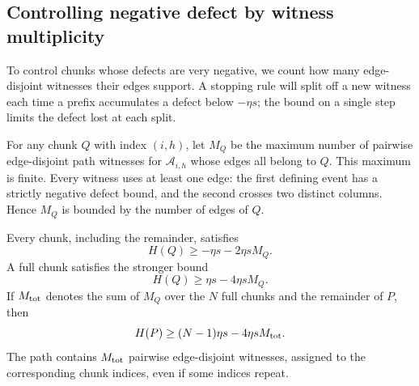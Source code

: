 \subsection{Controlling negative defect by witness multiplicity}

To control chunks whose defects are very negative, we count how many
edge-disjoint witnesses their edges support. A stopping rule will split
off a new witness each time a prefix accumulates a defect below $-\eta s$;
the bound on a single step limits the defect lost at each split.

For any chunk $Q$ with index $(i,h)$, let $M_Q$ be the maximum number of
pairwise edge-disjoint path witnesses for $\mathcal A_{i,h}$ whose edges
all belong to $Q$.  This maximum is finite.  Every witness uses at least
one edge: the first defining event has a strictly negative defect bound,
and the second crosses two distinct columns.  Hence $M_Q$ is bounded by
the number of edges of $Q$.

\begin{lemma}
\label{df:wi:chunk-defect}
Every chunk, including the remainder, satisfies
\begin{equation}
\label{df:wi:basic-defect}
  H(Q)\ge-\eta s-2\eta s M_Q.
\end{equation}
A full chunk satisfies the stronger bound
\begin{equation}
\label{df:wi:full-defect}
  H(Q)\ge\eta s-4\eta s M_Q.
\end{equation}
If $M_{\rm tot}$ denotes the sum of $M_Q$ over the $N$ full chunks and
the remainder of $P$, then
\begin{equation}
\label{df:wi:total-defect}
  H(P)\ge(N-1)\eta s-4\eta s M_{\rm tot}.
\end{equation}
The path contains $M_{\rm tot}$ pairwise edge-disjoint witnesses, assigned
to the corresponding chunk indices, even if some indices repeat.
\end{lemma}

